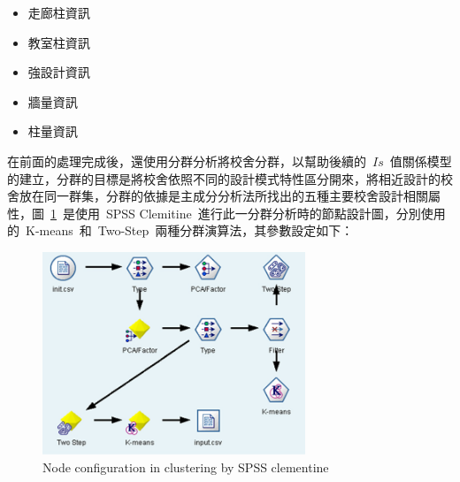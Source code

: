 \begin{itemize}
\item 走廊柱資訊
\item 教室柱資訊
\item 強設計資訊
\item 牆量資訊
\item 柱量資訊
\end{itemize}


在前面的處理完成後，還使用分群分析將校舍分群，以幫助後續的~$Is$~值關係模型的建立，分群的目標是將校舍依照不同的設計模式特性區分開來，將相近設計的校舍放在同一群集，分群的依據是主成分分析法所找出的五種主要校舍設計相關屬性，圖~\ref{fig:spss-cluster}~是使用~SPSS Clemitine~進行此一分群分析時的節點設計圖，分別使用的~K-means~和~Two-Step~兩種分群演算法，其參數設定如下：

\begin{figure}[hbtp]
  \begin{center}
    \includegraphics[width=0.7\textwidth]{figures/spss-cluster.png}
    \caption{Node configuration in clustering by SPSS clementine} 
    \label{fig:spss-cluster}
  \end{center}
\end{figure}

